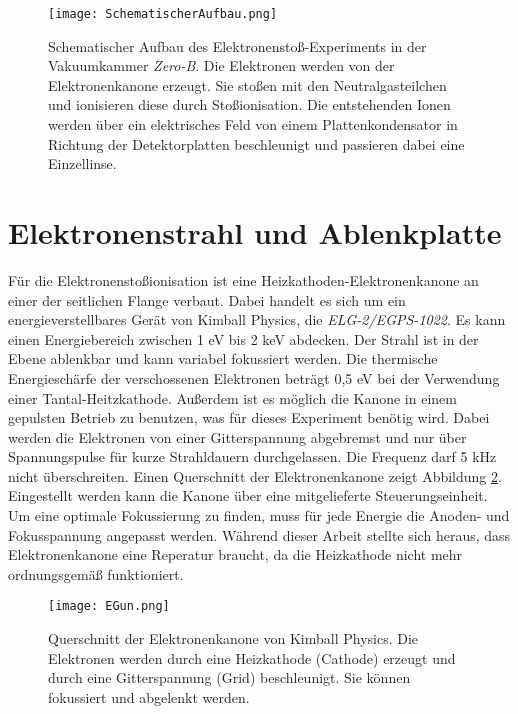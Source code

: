 \begin{landscape}
    \begin{figure}
        \centering
        \vspace{-1.5cm}\hspace{-4cm}\texttt{[image: SchematischerAufbau.png]}
        \caption[Schematischer Aufbau des Experiments]{Schematischer Aufbau des Elektronenstoß-Experiments in der Vakuumkammer \textit{Zero-B}. Die Elektronen werden von der Elektronenkanone erzeugt. Sie stoßen mit den Neutralgasteilchen und ionisieren diese durch Stoßionisation. Die entstehenden Ionen werden über ein elektrisches Feld von einem Plattenkondensator in Richtung der Detektorplatten beschleunigt und passieren dabei eine Einzellinse.}
        \label{fig:Aufbau}
    \end{figure}
\end{landscape}

\section{Elektronenstrahl und Ablenkplatte}
Für die Elektronenstoßionisation ist eine Heizkathoden-Elektronenkanone an einer der seitlichen Flange verbaut. Dabei handelt es sich um ein energieverstellbares Gerät von Kimball Physics, die \textit{ELG-2/EGPS-1022}. Es kann einen Energiebereich zwischen 1 eV bis 2 keV abdecken. Der Strahl ist in der Ebene ablenkbar und kann variabel fokussiert werden. Die thermische Energieschärfe der verschossenen Elektronen beträgt 0,5 eV bei der Verwendung einer Tantal-Heitzkathode. Außerdem ist es möglich die Kanone in einem gepulsten Betrieb zu benutzen, was für dieses Experiment benötig wird. Dabei werden die Elektronen von einer Gitterspannung abgebremst und nur über Spannungspulse für kurze Strahldauern durchgelassen. Die Frequenz darf 5 kHz nicht überschreiten. Einen Querschnitt der Elektronenkanone zeigt Abbildung \ref{fig:EGun}. Eingestellt werden kann die Kanone über eine mitgelieferte Steuerungseinheit. Um eine optimale Fokussierung zu finden, muss für jede Energie die Anoden- und Fokusspannung angepasst werden. Während dieser Arbeit stellte sich heraus, dass Elektronenkanone eine Reperatur braucht, da die Heizkathode nicht mehr ordnungsgemäß funktioniert.

\begin{figure}
    \centering
    \texttt{[image: EGun.png]}
    \caption[Querschnitt der Elektronenkanone]{Querschnitt der Elektronenkanone von Kimball Physics. Die Elektronen werden durch eine Heizkathode (Cathode) erzeugt und durch eine Gitterspannung (Grid) beschleunigt. Sie können fokussiert und abgelenkt werden.}
    \label{fig:EGun}
\end{figure}

